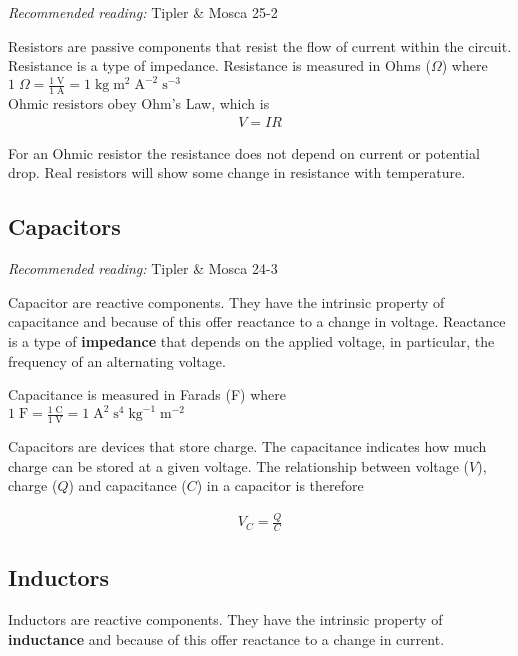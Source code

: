 \documentclass[
]{book}
\theoremstyle{definition}
\theoremstyle{definition}
\theoremstyle{definition}
\theoremstyle{definition}
\theoremstyle{remark}
\begin{document}
\emph{Recommended reading:} Tipler \& Mosca 25-2

Resistors are passive components that resist the flow of current within
the circuit. Resistance is a type of impedance. Resistance is measured
in Ohms (\(\Omega\)) where\\
\(1 \; \Omega = \frac{1 \; \text{V}}{1 \; \text{A}} = 1 \; \text{kg} \; \text{m}^2 \; \text{A}^{-2} \; \text{s}^{-3}\)\\
Ohmic resistors obey Ohm's Law, which is \[\begin{aligned}
V = IR
\end{aligned}\]

For an Ohmic resistor the resistance does not depend on current or
potential drop. Real resistors will show some change in resistance with
temperature.

\hypertarget{capacitors}{%
\subsection{Capacitors}\label{capacitors}}

\emph{Recommended reading:} Tipler \& Mosca 24-3

Capacitor are reactive components. They have the intrinsic property of
capacitance and because of this offer reactance to a change in voltage.
Reactance is a type of \textbf{impedance} that depends on the applied
voltage, in particular, the frequency of an alternating voltage.

Capacitance is measured in Farads (F) where\\
\(1 \; \text{F} = \frac{1 \; \text{C}}{1 \; \text{V}} = 1 \; \text{A}^2 \; \text{s}^4 \; \text{kg}^{-1} \; \text{m}^{-2}\)

Capacitors are devices that store charge. The capacitance indicates how
much charge can be stored at a given voltage. The relationship between
voltage (\(V\)), charge (\(Q\)) and capacitance (\(C\)) in a capacitor is
therefore

\[\begin{aligned}
V_C = \frac{Q}{C}
\end{aligned}\]

\hypertarget{inductors}{%
\subsection{Inductors}\label{inductors}}

Inductors are reactive components. They have the intrinsic property of
\textbf{inductance} and because of this offer reactance to a change in
current.
\end{document}
